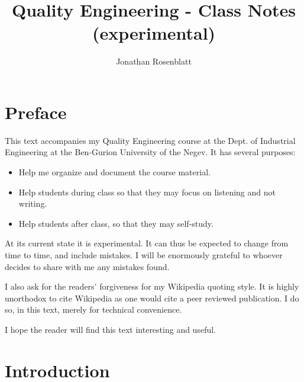 \documentclass[12pt,a4paper]{report}
\author{Jonathan Rosenblatt}
\title{Quality Engineering - Class Notes (experimental)}
\theoremstyle{plain}
\theoremstyle{definition}
\begin{document}
\maketitle


\chapter*{Preface}
This text accompanies my Quality Engineering course at the Dept. of Industrial Engineering at the Ben-Gurion University of the Negev.
It has several purposes:
\begin{itemize}
\item Help me organize and document the course material.
\item Help students during class so that they may focus on listening and not writing.
\item Help students after class, so that they may self-study.
\end{itemize}

At its current state it is experimental. It can thus be expected to change from time to time, and include mistakes.
I will be enormously grateful to whoever decides to share with me any mistakes found.

I also ask for the readers' forgiveness for my Wikipedia quoting style. 
It is highly unorthodox to cite Wikipedia as one would cite a peer reviewed publication. 
I do so, in this text, merely for technical convenience. 

I hope the reader will find this text interesting and useful. 




\tableofcontents

\listoffigures

\renewcommand{\listtheoremname}{List of Definitions}
\listoftheorems[ignoreall,show={definition}]






\chapter{Introduction}
\label{sec:introduction}
\end{document}
